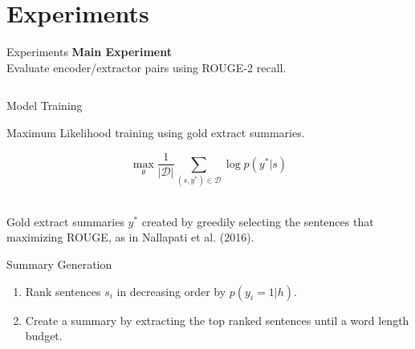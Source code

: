 
\section{Experiments}

\begin{frame}{Experiments}
%
    \alert<4>{\textbf{Main Experiment}}\\
    Evaluate encoder/extractor pairs using ROUGE-2 recall.\\
%
  \begin{columns}
    \begin{column}{0.3\textwidth}
      \begin{itemize}
      \end{itemize}
    \end{column}
    \begin{column}{0.7\textwidth}
         
    \end{column}
  \end{columns}
\end{frame}

\begin{frame}{Model Training}

    Maximum Likelihood training using gold extract summaries.

    \[\max_{\theta} \frac{1}{|\mathcal{D}|} \sum_{(s,y^*)\in \mathcal{D}} 
    \log p(y^*| s) \]

   
    ~\\

    Gold extract summaries $y^*$ created by greedily selecting the sentences that maximizing ROUGE, as in Nallapati et al. (2016).

\end{frame}

\begin{frame}{Summary Generation}

    \begin{enumerate}
        \item Rank sentences $s_i$ in decreasing order by $p(y_i=1|h)$.
        \item Create a summary by extracting the top ranked sentences until a word length budget.
    \end{enumerate}

\end{frame}


